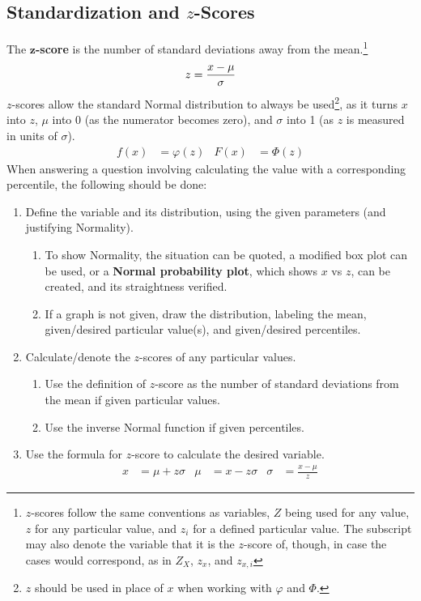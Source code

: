 \documentclass[../AP_Statistics.tex]{subfiles}
\begin{document}
			\subsection*{Standardization and $z$-Scores}
				The $\pmb{z}$\textbf{-score} is the number of standard deviations away from the mean.\footnote{$z$-scores follow the same conventions as variables, $Z$ being used for any value, $z$ for any particular value, and $z_i$ for a defined particular value. The subscript may also denote the variable that it is the $z$-score of, though, in case the cases would correspond, as in $Z_X$, $z_x$, and $z_{x,i}$}
				$$z = \frac{x - \mu}{\sigma}$$
				$z$-scores allow the standard Normal distribution to always be used\footnote{$z$ should be used in place of $x$ when working with $\varphi$ and $\Phi$.}, as it turns $x$ into $z$, $\mu$ into 0 (as the numerator becomes zero), and $\sigma$ into 1 (as $z$ is measured in units of $\sigma$).
				\begin{align*}
					f(x) &= \varphi(z) & F(x) &= \Phi(z)
				\end{align*}
				When answering a question involving calculating the value with a corresponding percentile, the following should be done:
				\begin{enumerate}
					\item Define the variable and its distribution, using the given parameters (and justifying Normality).
					\begin{enumerate}
						\item To show Normality, the situation can be quoted, a modified box plot can be used, or a \textbf{Normal probability plot}, which shows $x$ vs $z$, can be created, and its straightness verified.
						\item If a graph is not given, draw the distribution, labeling the mean, given/desired particular value(s), and given/desired percentiles.
					\end{enumerate}
					\item Calculate/denote the $z$-scores of any particular values.
					\begin{enumerate}
						\item Use the definition of $z$-score as the number of standard deviations from the mean if given particular values.
						\item Use the inverse Normal function if given percentiles.
					\end{enumerate}
					\item Use the formula for $z$-score to calculate the desired variable.
						\begin{align*}
							x &= \mu + z\sigma & \mu &= x - z\sigma & \sigma &= \frac{x - \mu}{z}
						\end{align*}
				\end{enumerate}
\end{document}
